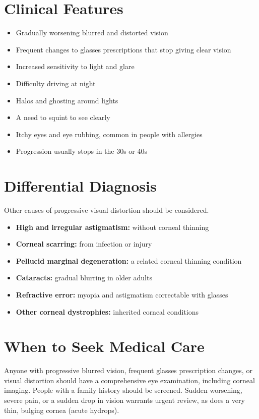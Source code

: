 \section*{Clinical Features}
\begin{itemize}
    \item Gradually worsening blurred and distorted vision
    \item Frequent changes to glasses prescriptions that stop giving clear vision
    \item Increased sensitivity to light and glare
    \item Difficulty driving at night
    \item Halos and ghosting around lights
    \item A need to squint to see clearly
    \item Itchy eyes and eye rubbing, common in people with allergies
    \item Progression usually stops in the 30s or 40s
\end{itemize}

\section*{Differential Diagnosis}
Other causes of progressive visual distortion should be considered.
\begin{itemize}
    \item \textbf{High and irregular astigmatism:} without corneal thinning
    \item \textbf{Corneal scarring:} from infection or injury
    \item \textbf{Pellucid marginal degeneration:} a related corneal thinning condition
    \item \textbf{Cataracts:} gradual blurring in older adults
    \item \textbf{Refractive error:} myopia and astigmatism correctable with glasses
    \item \textbf{Other corneal dystrophies:} inherited corneal conditions
\end{itemize}

\section*{When to Seek Medical Care}
Anyone with progressive blurred vision, frequent glasses prescription changes, or visual distortion should have a comprehensive eye examination, including corneal imaging. People with a family history should be screened. Sudden worsening, severe pain, or a sudden drop in vision warrants urgent review, as does a very thin, bulging cornea (acute hydrops).

